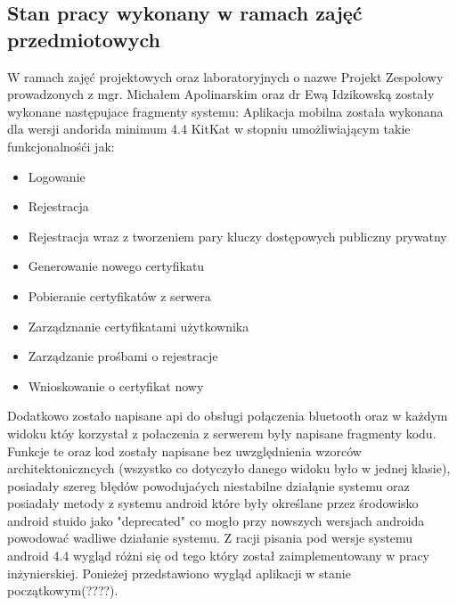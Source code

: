 \subsection{Stan pracy wykonany w ramach zajęć \newline przedmiotowych} 
W ramach zajęć projektowych oraz laboratoryjnych o nazwe Projekt Zespołowy prowadzonych z mgr. Michałem Apolinarskim oraz dr Ewą Idzikowską zostały wykonane następujace fragmenty systemu:
	Aplikacja mobilna została wykonana dla wersji andorida minimum 4.4 KitKat w stopniu umożliwiającym takie funkcjonalnośći jak:
	\begin{itemize}
		\item Logowanie
		\item Rejestracja
		\item Rejestracja wraz z tworzeniem pary kluczy dostępowych publiczny prywatny
		\item Generowanie nowego certyfikatu
		\item Pobieranie certyfikatów z serwera
		\item Zarządznanie certyfikatami użytkownika
		\item Zarządzanie prośbami o rejestracje
		\item Wnioskowanie o certyfikat nowy
	\end{itemize}
		Dodatkowo zostało napisane api do obsługi połączenia bluetooth oraz w każdym widoku któy korzystał z połaczenia z serwerem były napisane fragmenty kodu. Funkcje te oraz kod zostały napisane bez uwzględnienia wzorców architektoniczncych (wszystko co dotyczyło danego widoku było w jednej klasie), posiadały szereg błędów powodujaćych niestabilne działąnie systemu oraz posiadały metody z systemu android które były określane przez środowisko android stuido jako "deprecated" co mogło przy nowszych wersjach androida powodować wadliwe działanie systemu. Z racji pisania pod wersje systemu android 4.4 wygląd różni się od tego który został zaimplementowany w pracy inżynierskiej. Ponieżej przedstawiono wygląd aplikacji w stanie początkowym(????).
		 
	
	
